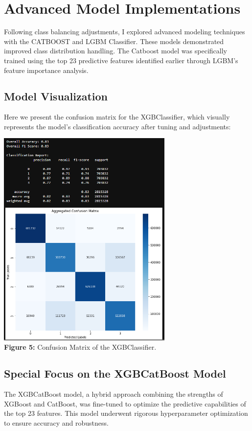 \documentclass[12pt]{article}
\begin{document}
\maketitle

\section{Advanced Model Implementations}
Following class balancing adjustments, I explored advanced modeling techniques with the CATBOOST and LGBM Classifier. These models demonstrated improved class distribution handling. The Catboost model was specifically trained using the top 23 predictive features identified earlier through LGBM's feature importance analysis.

\subsection*{Model Visualization}
Here we present the confusion matrix for the XGBClassifier, which visually represents the model's classification accuracy after tuning and adjustments:

\begin{center}
    \includegraphics[width=0.65\textwidth]{XGBCon_matr.png} %
    \textbf{\\Figure 5:} Confusion Matrix of the XGBClassifier.
\end{center}

\subsection*{Special Focus on the XGBCatBoost Model}
The XGBCatBoost model, a hybrid approach combining the strengths of XGBoost and CatBoost, was fine-tuned to optimize the predictive capabilities of the top 23 features. This model underwent rigorous hyperparameter optimization to ensure accuracy and robustness.
\end{document}
